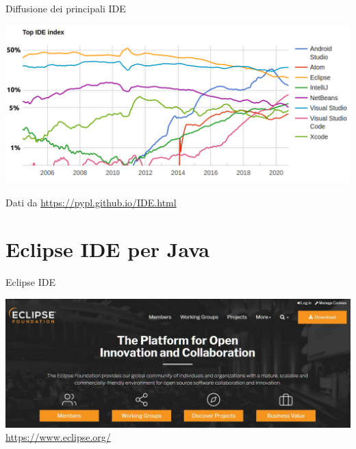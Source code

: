 \documentclass[presentation]{beamer}
\begin{document}
\begin{frame}{Diffusione dei principali IDE}
	\begin{center}
		\includegraphics[width=\textwidth]{img/ide2020.png}
	\end{center}
	\centering
	Dati da \url{https://pypl.github.io/IDE.html}
\end{frame}

\section{Eclipse IDE per Java}

\begin{frame}{Eclipse IDE}
\begin{center}
\includegraphics[width=\textwidth]{img/eclipse-web-site.png}
\url{https://www.eclipse.org/}
\end{center}
\end{frame}
\end{document}
